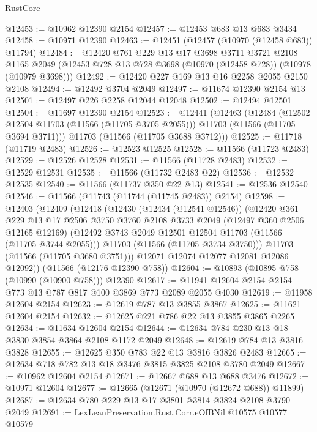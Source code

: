 \begin{lexlean}{RustCore}
\begin{coremodule}
@12453 := @10962 @12390 @2154
@12457 := @12453 @683 @13 @683 @3434
@12458 := @10971 @12390
@12463 := @12451 (@12457 (@10970 (@12458 @683)) @11794)
@12484 := @12420
    @761
    @229
    @13
    @17
    @3698
    @3711
    @3721
    @2108
    @1165
    @2049
    (@12453 @728 @13 @728 @3698 (@10970 (@12458 @728)) (@10978 (@10979 @3698)))
@12492 := @12420 @227 @169 @13 @16 @2258 @2055 @2150 @2108
@12494 := @12492 @3704 @2049
@12497 := @11674 @12390 @2154 @13
@12501 := @12497 @226 @2258 @12044 @12048
@12502 := @12494 @12501
@12504 := @11697 @12390 @2154
@12523 := @12441
    (@12463
      (@12484
        (@12502 @12504 @11703 (@11566 (@11705 @3705 @2055)))
        @11703
        (@11566 (@11705 @3694 @3711)))
      @11703
      (@11566 (@11705 @3688 @3712)))
@12525 := @11718 (@11719 @2483)
@12526 := @12523 @12525
@12528 := @11566 (@11723 @2483)
@12529 := @12526 @12528
@12531 := @11566 (@11728 @2483)
@12532 := @12529 @12531
@12535 := @11566 (@11732 @2483 @22)
@12536 := @12532 @12535
@12540 := @11566 (@11737 @350 @22 @13)
@12541 := @12536 @12540
@12546 := @11566 (@11743 (@11744 (@11745 @2483)) @2154)
@12598 := @12403
    (@12409
      (@12418
        (@12430
          (@12434 (@12541 @12546))
          (@12420
            @361
            @229
            @13
            @17
            @2506
            @3750
            @3760
            @2108
            @3733
            @2049
            (@12497 @360 @2506 @12165 @12169)
            (@12492 @3743 @2049 @12501 @12504 @11703 (@11566 (@11705 @3744 @2055)))
            @11703
            (@11566 (@11705 @3734 @3750)))
          @11703
          (@11566 (@11705 @3680 @3751)))
        @12071
        @12074
        @12077
        @12081
        @12086
        @12092))
    (@11566 (@12176 @12390 @758))
@12604 := @10893 (@10895 @758 (@10990 (@10900 @758))) @12390
@12617 := @11941 @12604 @2154 @2154 @773 @13 @787 @817 @100 @3869 @773 @2089 @2055 @4030
@12619 := @11958 @12604 @2154
@12623 := @12619 @787 @13 @3855 @3867
@12625 := @11621 @12604 @2154
@12632 := @12625 @221 @786 @22 @13 @3855 @3865 @2265
@12634 := @11634 @12604 @2154
@12644 := @12634 @784 @230 @13 @18 @3830 @3854 @3864 @2108 @1172 @2049
@12648 := @12619 @784 @13 @3816 @3828
@12655 := @12625 @350 @783 @22 @13 @3816 @3826 @2483
@12665 := @12634 @718 @782 @13 @18 @3476 @3815 @3825 @2108 @3780 @2049
@12667 := @10962 @12604 @2154
@12671 := @12667 @688 @13 @688 @3476
@12672 := @10971 @12604
@12677 := @12665 (@12671 (@10970 (@12672 @688)) @11899)
@12687 := @12634 @780 @229 @13 @17 @3801 @3814 @3824 @2108 @3790 @2049
@12691 := LexLeanPreservation.Rust.Corr.eOfBNil @10575 @10577 @10579

\end{coremodule}
\end{lexlean}

